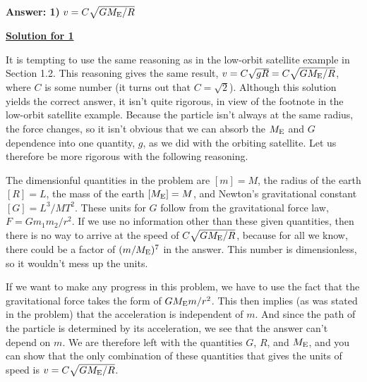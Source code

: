 \textbf{Answer: 1)} $v = C\sqrt{GM_{\rm E}/R}$

\underline{\textbf{Solution for 1}}


It is tempting to use the same reasoning as in the low-orbit satellite example in Section 1.2. This reasoning gives the same result, $v = C\sqrt{gR} = C\sqrt{GM_{\rm E}/R}$, where $C$ is some number (it turns out that $C = \sqrt{2}$). Although this solution yields the correct answer, it isn't quite rigorous, in view of the footnote in the low-orbit satellite example. Because the particle isn't always at the same radius, the force changes, so it isn't obvious that we can absorb the $M_{\rm E}$ and $G$ dependence into one quantity, $g$, as we did with the orbiting satellite. Let us therefore be more rigorous with the following reasoning.

The dimensionful quantities in the problem are $[m] = M$, the radius of the earth $[R] = L$, the mass of the earth $[M_{\rm E}] = M$, and Newton's gravitational constant $[G] = L^3/MT^2$. These units for $G$ follow from the gravitational force law, $F = Gm_1m_2/r^2$. If we use no information other than these given quantities, then there is no way to arrive at the speed of $C\sqrt{GM_{\rm E}/R}$, because for all we know, there could be a factor of $(m/M_{\rm E})^7$ in the answer. This number is dimensionless, so it wouldn't mess up the units.

If we want to make any progress in this problem, we have to use the fact that the gravitational force takes the form of $GM_{\rm E}m/r^2$. This then implies (as was stated in the problem) that the acceleration is independent of $m$. And since the path of the particle is determined by its acceleration, we see that the answer can't depend on $m$. We are therefore left with the quantities $G$, $R$, and $M_{\rm E}$, and you can show that the only combination of these quantities that gives the units of speed is $v = C\sqrt{GM_{\rm E}/R}$.